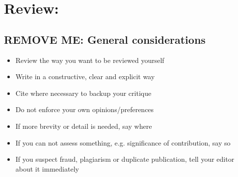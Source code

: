 
\chapter*{Review: \textcolor{HighlightColor}{\metaTitle}}\minitoc\label{sec:review}\vspace{.5cm}
\setcounter{chapter}{1}
\noindent\lipsum[7]

\section*{REMOVE ME: General considerations}
\begin{itemize}[resume]
    \item Review the way you want to be reviewed yourself
    \item Write in a constructive, clear and explicit way
    \item Cite where necessary to backup your critique
    \item Do not enforce your own opinions/preferences
    \item If more brevity or detail is needed, say where
    \item If you can not assess something, e.g. significance of contribution, say so
    \item If you suspect fraud, plagiarism or duplicate publication, tell your editor about it immediately
\end{itemize}

